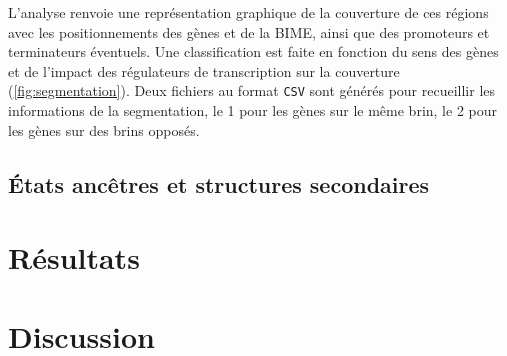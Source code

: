 \documentclass[12pt,a4paper]{report}
\begin{document}
\begin{onehalfspace}
L'analyse renvoie une représentation graphique de la couverture de ces régions avec les positionnements des gènes et de la BIME, ainsi que des promoteurs et terminateurs éventuels. Une classification est faite en fonction du sens des gènes et de l'impact des régulateurs de transcription sur la couverture (\autoref{fig:segmentation}). Deux fichiers au format \texttt{CSV} sont générés pour recueillir les informations de la segmentation, le 1 pour les gènes sur le même brin, le 2 pour les gènes sur des brins opposés.

\section*{États ancêtres et structures secondaires}

\chapter*{Résultats}

\chapter*{Discussion}


\end{onehalfspace}


\renewcommand{\thepage}{}
\printglossary[type=\acronymtype ,title=Glossaire]

%

\end{document}

